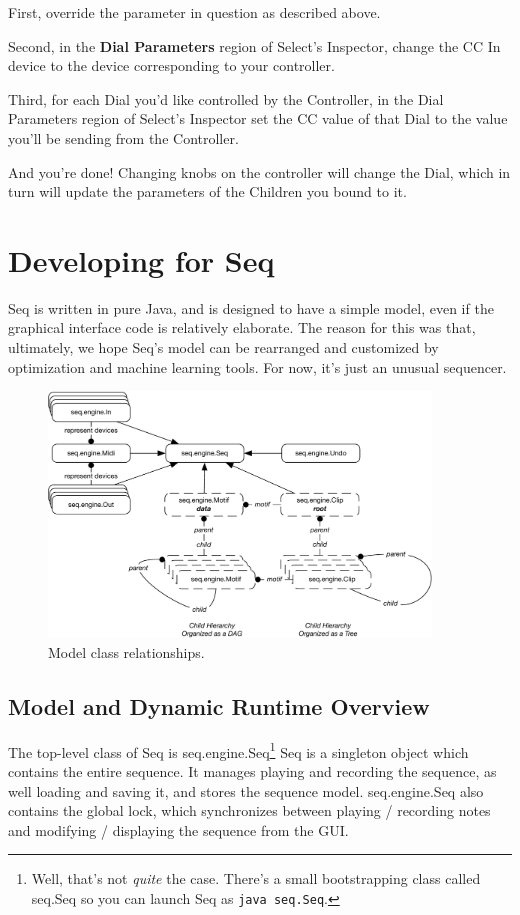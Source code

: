\documentclass[twoside,10pt]{article}
\begin{document}
First, override the parameter in question as described above.

Second, in the {\bf Dial Parameters} region of Select's Inspector, change the CC In device to the device corresponding to your controller.

Third, for each Dial you'd like controlled by the Controller, in the Dial Parameters region of Select's Inspector set the CC value of that Dial to the value you'll be sending from the Controller.

And you're done!  Changing knobs on the controller will change the Dial, which in turn will update the parameters of the Children you bound to it.

\section{Developing for Seq}

Seq is written in pure Java, and is designed to have a simple model, even if the graphical interface code is relatively elaborate.  The reason for this was that, ultimately, we hope Seq's model can be rearranged and customized by optimization and machine learning tools.  For now, it's just an unusual sequencer.

\begin{figure}[t]
\centering
\includegraphics[width=4in]{model}
\caption{Model class relationships.}
\label{modeldev}
\end{figure}


\subsection{Model and Dynamic Runtime Overview}

The top-level class of Seq is {\sf seq.engine.Seq}\footnote{Well, that's not {\it quite} the case.  There's a small bootstrapping class called {\sf seq.Seq} so you can launch Seq as {\tt java seq.Seq}.}  Seq is a singleton object which contains the entire sequence.  It manages playing and recording the sequence,  as well loading and saving it, and stores the sequence model.  {\sf seq.engine.Seq} also contains the global lock, which synchronizes between playing / recording notes and modifying / displaying the sequence from the GUI.
\end{document}
